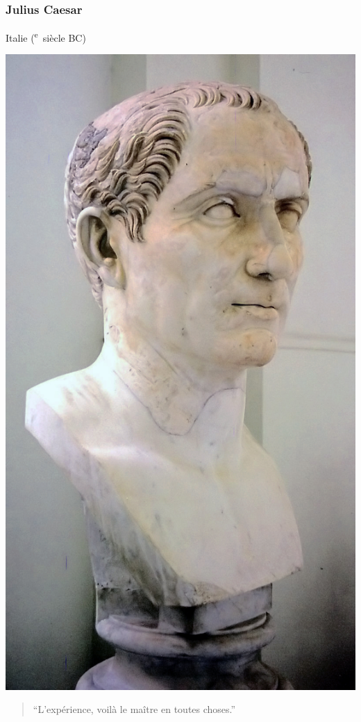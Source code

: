 \documentclass{article}
\newcommand{\cRM}[1]{\MakeUppercase{\romannumeral #1}}  %
\newcommand{\siecle}[1]{\cRM{#1}\textsuperscript{e}~siècle}
\begin{document}
\subsubsection{Julius Caesar}
Italie (\siecle{1} BC)
\hfill \begin{minipage}{5cm}
\includegraphics[width=\linewidth]{../ressources/cesare}
\end{minipage}
\begin{quote}“L’expérience, voilà le maître en toutes choses.”\end{quote}
\end{document}

